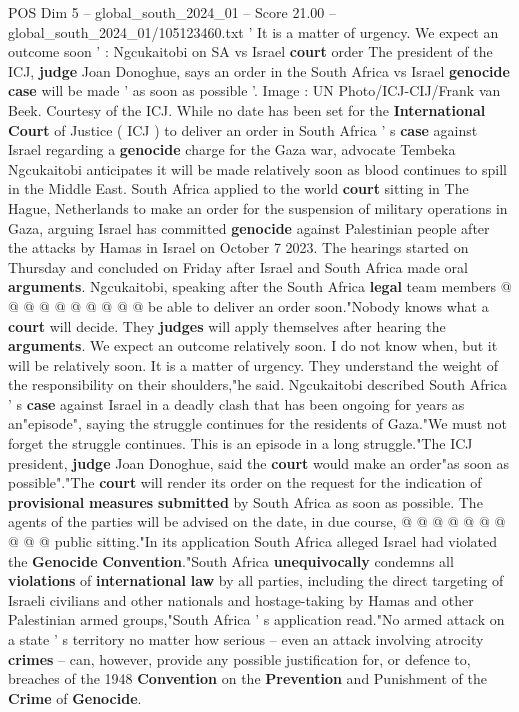\begin{textsample}{POS Dim 5 – global\_south\_2024\_01 – Score 21.00 – global\_south\_2024\_01/105123460.txt}  \label{ex:f5_pos_013}
' It is a matter of urgency.
We expect an outcome soon ' : Ngcukaitobi on SA vs Israel \textbf{court} order The president of the ICJ, \textbf{judge} Joan Donoghue, says an order in the South Africa vs Israel \textbf{genocide} \textbf{case} will be made ' as soon as possible '.
Image : UN Photo/ICJ-CIJ/Frank van Beek.
Courtesy of the ICJ.
While no date has been set for the \textbf{International} \textbf{Court} of Justice ( ICJ ) to deliver an order in South Africa ' s \textbf{case} against Israel regarding a \textbf{genocide} charge for the Gaza war, advocate Tembeka Ngcukaitobi anticipates it will be made relatively soon as blood continues to spill in the Middle East.
South Africa applied to the world \textbf{court} sitting in The Hague, Netherlands to make an order for the suspension of military operations in Gaza, arguing Israel has committed \textbf{genocide} against Palestinian people after the attacks by Hamas in Israel on October 7 2023.
The hearings started on Thursday and concluded on Friday after Israel and South Africa made oral \textbf{arguments}.
Ngcukaitobi, speaking after the South Africa \textbf{legal} team members @ @ @ @ @ @ @ @ @ @ be able to deliver an order soon."Nobody knows what a \textbf{court} will decide.
They \textbf{judges} will apply themselves after hearing the \textbf{arguments}.
We expect an outcome relatively soon.
I do not know when, but it will be relatively soon.
It is a matter of urgency.
They understand the weight of the responsibility on their shoulders,"he said.
Ngcukaitobi described South Africa ' s \textbf{case} against Israel in a deadly clash that has been ongoing for years as an"episode", saying the struggle continues for the residents of Gaza."We must not forget the struggle continues.
This is an episode in a long struggle."The ICJ president, \textbf{judge} Joan Donoghue, said the \textbf{court} would make an order"as soon as possible"."The \textbf{court} will render its order on the request for the indication of \textbf{provisional} \textbf{measures} \textbf{submitted} by South Africa as soon as possible.
The agents of the parties will be advised on the date, in due course, @ @ @ @ @ @ @ @ @ @ public sitting."In its application South Africa alleged Israel had violated the \textbf{Genocide} \textbf{Convention}."South Africa \textbf{unequivocally} condemns all \textbf{violations} of \textbf{international} \textbf{law} by all parties, including the direct targeting of Israeli civilians and other nationals and hostage-taking by Hamas and other Palestinian armed groups,"South Africa ' s application read."No armed attack on a state ' s territory no matter how serious -- even an attack involving atrocity \textbf{crimes} -- can, however, provide any possible justification for, or defence to, breaches of the 1948 \textbf{Convention} on the \textbf{Prevention} and Punishment of the \textbf{Crime} of \textbf{Genocide}.

\end{textsample}
